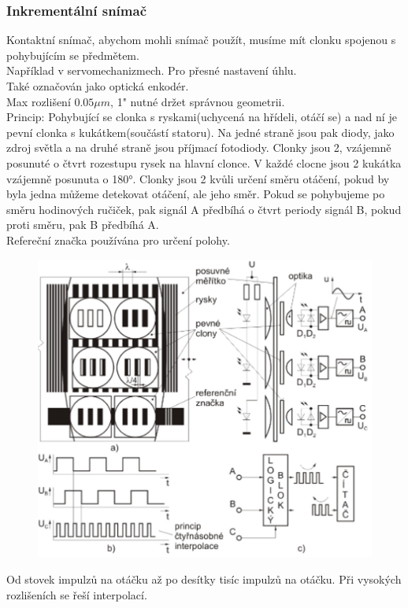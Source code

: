 \subsubsection{Inkrementální snímač}
Kontaktní snímač, abychom mohli snímač použít, musíme mít clonku spojenou s pohybujícím se předmětem.\\
Například v servomechanizmech. Pro přesné nastavení úhlu.\\
Také označován jako optická enkodér.\\
Max rozlišení \(0.05\mu m\), 1" nutné držet správnou geometrii.\\
Princip: Pohybující se clonka s ryskami(uchycená na hřídeli, otáčí se) a nad ní je pevní clonka s kukátkem(součástí statoru). Na jedné straně jsou pak diody, jako zdroj světla a na druhé straně jsou příjmací fotodiody. Clonky jsou 2, vzájemně posunuté o čtvrt rozestupu rysek na hlavní clonce. V každé clocne jsou 2 kukátka vzájemně posunuta o 180°. Clonky jsou 2 kvůli určení směru otáčení, pokud by byla jedna můžeme detekovat otáčení, ale jeho směr. Pokud se pohybujeme po směru hodinových ručiček, pak signál A předbíhá o čtvrt periody signál B, pokud proti směru, pak B předbíhá A.\\
Refereční značka používána pro určení polohy.\\
\begin{figure}[h!]
    \centering
    \includegraphics[scale = 0.1]{img/Inkrem.png}
\end{figure}
Od stovek impulzů na otáčku až po desítky tisíc impulzů na otáčku. Při vysokých rozlišeních se řeší interpolací.\\
\newpage
